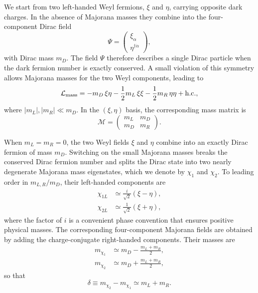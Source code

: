 \documentclass[aps,prd,reprint,superscriptaddress,nofootinbib,longbibliography,floatfix]{revtex4-2}
\begin{document}
We start from two left-handed Weyl fermions, $\xi$ and $\eta$, carrying opposite dark charges. In the absence of Majorana masses they combine into the four-component Dirac field
\begin{equation}
\Psi=
\begin{pmatrix}
\xi_\alpha\\
\eta^{\dagger\dot{\alpha}}
\end{pmatrix},
\end{equation}
with Dirac mass $m_D$. The field $\Psi$ therefore describes a single Dirac particle when the dark fermion number is exactly conserved. A small violation of this symmetry allows Majorana masses for the two Weyl components, leading to
\begin{equation}
\mathcal{L}_{\rm mass}
=-m_D\,\xi\eta
-\frac{1}{2}m_L\,\xi\xi
-\frac{1}{2}m_R\,\eta\eta
+\mathrm{h.c.},
\label{eq:pseudodiracmass}
\end{equation}
where $|m_L|,|m_R|\ll m_D$. In the $(\xi,\eta)$ basis, the corresponding mass matrix is
\begin{equation}
\mathcal{M}=
\begin{pmatrix}
m_L & m_D\\
m_D & m_R
\end{pmatrix}.
\label{eq:pseudodiracmatrix}
\end{equation}

When $m_L=m_R=0$, the two Weyl fields $\xi$ and $\eta$ combine into an exactly Dirac fermion of mass $m_D$. Switching on the small Majorana masses breaks the conserved Dirac fermion number and splits the Dirac state into two nearly degenerate Majorana mass eigenstates, which we denote by $\chi_1$ and $\chi_2$. To leading order in $m_{L,R}/m_D$, their left-handed components are
\begin{align}
\chi_{1L} &\simeq \frac{i}{\sqrt{2}}\left(\xi-\eta\right),\\
\chi_{2L} &\simeq \frac{1}{\sqrt{2}}\left(\xi+\eta\right),
\end{align}
where the factor of $i$ is a convenient phase convention that ensures positive physical masses. The corresponding four-component Majorana fields are obtained by adding the charge-conjugate right-handed components. Their masses are
\begin{align}
m_{\chi_1}&\simeq m_D-\frac{m_L+m_R}{2},\\
m_{\chi_2}&\simeq m_D+\frac{m_L+m_R}{2},
\end{align}
so that
\begin{equation}
\delta\equiv m_{\chi_2}-m_{\chi_1}\simeq m_L+m_R.
\end{equation}
\end{document}

